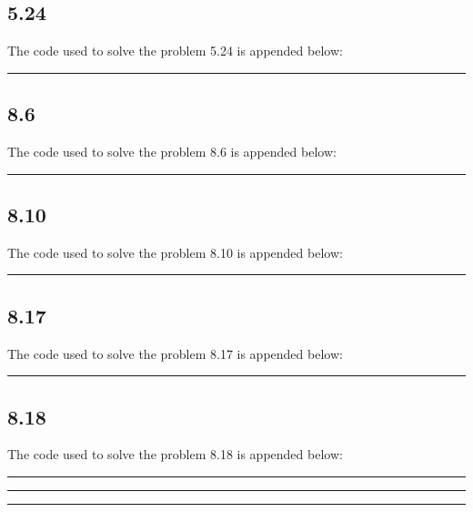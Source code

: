 \subsection*{5.24}
The code used to solve the problem 5.24 is appended below: 
\hrule
\subsection*{8.6}
The code used to solve the problem 8.6 is appended below: 
\hrule
\subsection*{8.10}
The code used to solve the problem 8.10 is appended below: 
\hrule
\subsection*{8.17}
The code used to solve the problem 8.17 is appended below: 
\hrule
\subsection*{8.18}
The code used to solve the problem 8.18 is appended below: 
\hrule\hrule\hrule

